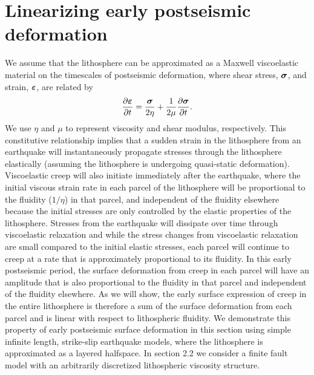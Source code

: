 \documentclass[extra]{gji}
\begin{document}
\section{Linearizing early postseismic deformation} 
We assume that the lithosphere can be approximated as a Maxwell
viscoelastic material on the timescales of postseismic deformation,
where shear stress, $\mitbf{\sigma}$, and strain,
$\mitbf{\varepsilon}$, are related by
\begin{equation}
  \frac{\partial\mitbf{\varepsilon}}{\partial t}=\frac{\mitbf{\sigma}}{2\eta} + 
                              \frac{1}{2\mu}\frac{\partial\mitbf{\sigma}}{\partial t}.
\end{equation}
We use $\eta$ and $\mu$ to represent viscosity and shear modulus,
respectively.  This constitutive relationship implies that a sudden
strain in the lithosphere from an earthquake will instantaneously
propagate stresses through the lithosphere elastically (assuming the
lithosphere is undergoing quasi-static deformation).  Viscoelastic
creep will also initiate immediately after the earthquake, where the
initial viscous strain rate in each parcel of the lithosphere will be
proportional to the fluidity ($1/\eta$) in that parcel, and
independent of the fluidity elsewhere because the initial stresses are
only controlled by the elastic properties of the lithosphere.
Stresses from the earthquake will dissipate over time through
viscoelastic relaxation and while the stress changes from viscoelastic
relaxation are small compared to the initial elastic stresses, each
parcel will continue to creep at a rate that is approximately
proportional to its fluidity.  In this early postseismic period, the
surface deformation from creep in each parcel will have an amplitude
that is also proportional to the fluidity in that parcel and
independent of the fluidity elsewhere.  As we will show, the early
surface expression of creep in the entire lithosphere is therefore a
sum of the surface deformation from each parcel and is linear with
respect to lithospheric fluidity.  We demonstrate this property of
early postseismic surface deformation in this section using simple
infinite length, strike-slip earthquake models, where the lithosphere
is approximated as a layered halfspace. In section 2.2 we consider a
finite fault model with an arbitrarily discretized lithospheric
viscosity structure.
\end{document}

